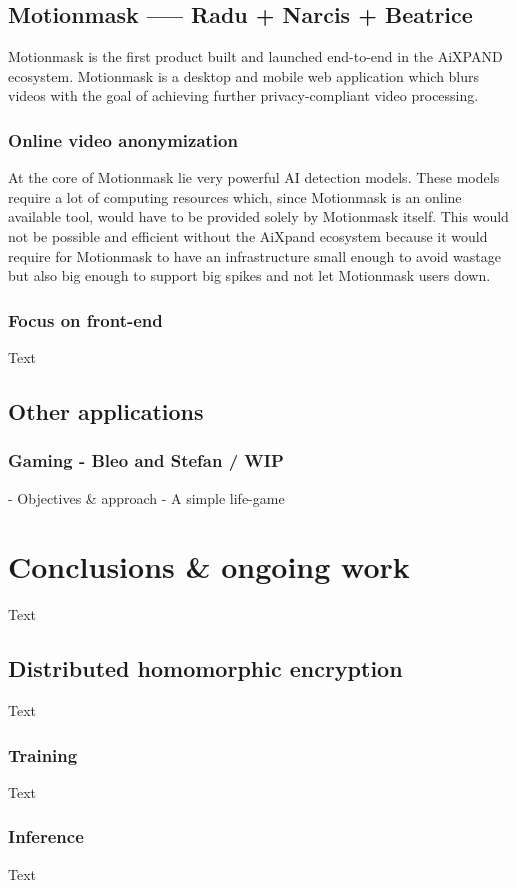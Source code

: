 \documentclass{article}
\begin{document}
\subsection{Motionmask \texttrademark ----- Radu + Narcis + Beatrice}
Motionmask is the first product built and launched end-to-end in the AiXPAND ecosystem. Motionmask is a desktop and mobile web application which blurs videos with the goal of achieving further privacy-compliant video processing.
\subsubsection{Online video anonymization}
At the core of Motionmask lie very powerful AI detection models. These models require a lot of computing resources which, since Motionmask is an online available tool, would have to be provided solely by Motionmask itself. This would not be possible and efficient without the AiXpand ecosystem because it would require for Motionmask to have an infrastructure small enough to avoid wastage but also big enough to support big spikes and not let Motionmask users down. 
\subsubsection{Focus on front-end}
Text

\subsection{Other applications}
\subsubsection{Gaming - Bleo and Stefan / WIP}
 - Objectives \& approach
 - A simple life-game


\section{Conclusions \& ongoing work}
Text
\subsection{Distributed homomorphic encryption}
Text
\subsubsection{Training}
Text
\subsubsection{Inference}
Text
\end{document}
